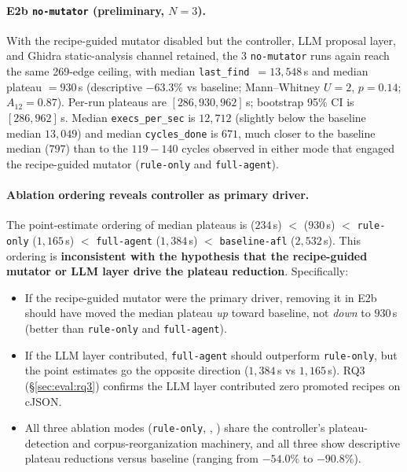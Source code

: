\documentclass[11pt]{article}
\begin{document}
\paragraph{E2b \texttt{no-mutator} (preliminary, $N{=}3$).}
With the recipe-guided mutator disabled but the controller, LLM
proposal layer, and Ghidra static-analysis channel retained, the 3
\texttt{no-mutator} runs again reach the same 269-edge ceiling,
with median \texttt{last\_find}~$=13{,}548$\,s and median plateau
$=930$\,s (descriptive $-63.3\%$ vs baseline; Mann--Whitney
$U{=}2$, $p{=}0.14$; $A_{12}{=}0.87$). Per-run plateaus are
$[286, 930, 962]$\,s; bootstrap 95\% CI is $[286, 962]$\,s.
Median \texttt{execs\_per\_sec} is $12{,}712$ (slightly below the
baseline median $13{,}049$) and median \texttt{cycles\_done} is
$671$, much closer to the baseline median ($797$) than to the
$119{-}140$ cycles observed in either mode that engaged the
recipe-guided mutator (\texttt{rule-only} and \texttt{full-agent}).

\paragraph{Ablation ordering reveals controller as primary driver.}
The point-estimate ordering of median plateaus is
 ($234$\,s) $<$ 
($930$\,s) $<$ \texttt{rule-only} ($1{,}165$\,s) $<$
\texttt{full-agent} ($1{,}384$\,s) $<$ \texttt{baseline-afl}
($2{,}532$\,s). This ordering is \textbf{inconsistent with the
hypothesis that the recipe-guided mutator or LLM layer drive the
plateau reduction}. Specifically:

\begin{itemize}
\item If the recipe-guided mutator were the primary driver, removing
it in E2b should have moved the median plateau \emph{up} toward
baseline, not \emph{down} to $930$\,s (better than \texttt{rule-only}
and \texttt{full-agent}).

\item If the LLM layer contributed, \texttt{full-agent} should
outperform \texttt{rule-only}, but the point estimates go the
opposite direction ($1{,}384$\,s vs $1{,}165$\,s). RQ3
(\S\ref{sec:eval:rq3}) confirms the LLM layer contributed zero
promoted recipes on cJSON.

\item All three ablation modes (\texttt{rule-only},
, ) share the
controller's plateau-detection and corpus-reorganization machinery,
and all three show descriptive plateau reductions versus baseline
(ranging from $-54.0\%$ to $-90.8\%$).
\end{itemize}
\end{document}

